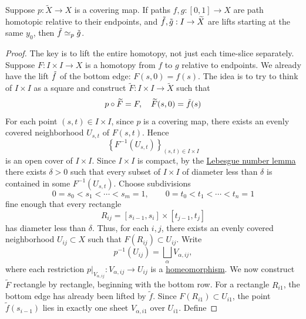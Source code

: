   \begin{lemma}
    \label{thm:homotopy-lifting-property}
		Suppose $p: \widetilde{X} \to X$ is a covering map. If paths $f, g: [0, 1] \to X$ are path homotopic relative to their endpoints, and $\Tilde{f}, \Tilde{g}: I \to \widetilde{X}$ are lifts starting at the same $y_0$, then $\Tilde{f} \simeq_p \Tilde{g}$.
  \end{lemma}
	\begin{proof}
		The key is to lift the entire homotopy, not just each time-slice separately. Suppose $F: I \times I \to X$ is a homotopy from $f$ to $g$ relative to endpoints. We already have the lift $\Tilde{f}$ of the bottom edge: $F(s, 0) = f(s)$. The idea is to try to think of $I \times I$ as a square and construct $\widetilde{F}: I \times I \to \widetilde{X}$ such that 
		\begin{equation}
			p \circ \widetilde{F} = F, \quad \widetilde{F}(s, 0) = \Tilde{f}(s)
		\end{equation}
		For each point $(s,t)\in I\times I$, since $p$ is a covering map, there exists an evenly covered neighborhood $U_{s,t}$ of $F(s,t)$. Hence
		\begin{equation}
			\left\{F^{-1}(U_{s,t})\right\}_{(s,t)\in I\times I}
		\end{equation}
		is an open cover of $I\times I$. Since $I\times I$ is compact, by the \hyperref[pst-thm:lebesgue-number-lemma]{Lebesgue number lemma} there exists $\delta>0$ such that every subset of $I\times I$ of diameter less than $\delta$ is contained in some $F^{-1}(U_{s,t})$. Choose subdivisions
		\begin{equation}
			0=s_0<s_1<\cdots<s_m=1, \qquad 0=t_0<t_1<\cdots<t_n=1
		\end{equation}
		fine enough that every rectangle
		\begin{equation}
			R_{ij} = [s_{i-1},s_i]\times[t_{j-1},t_j]
		\end{equation}
		has diameter less than $\delta$. Thus, for each $i,j$, there exists an evenly covered neighborhood $U_{ij}\subset X$ such that $F(R_{ij})\subset U_{ij}$. Write
		\begin{equation}
			p^{-1}(U_{ij}) = \bigsqcup_{\alpha} V_{\alpha,ij},
		\end{equation}
		where each restriction $p|_{V_{\alpha,ij}}:V_{\alpha,ij}\to U_{ij}$ is a \hyperref[pst-def:homeomorphism]{homeomorphism}. We now construct $\widetilde{F}$ rectangle by rectangle, beginning with the bottom row. For a rectangle $R_{i1}$, the bottom edge has already been lifted by $\widetilde{f}$. Since $F(R_{i1})\subset U_{i1}$, the point $\widetilde{f}(s_{i-1})$ lies in exactly one sheet $V_{\alpha,i1}$ over $U_{i1}$. Define

\end{proof}
